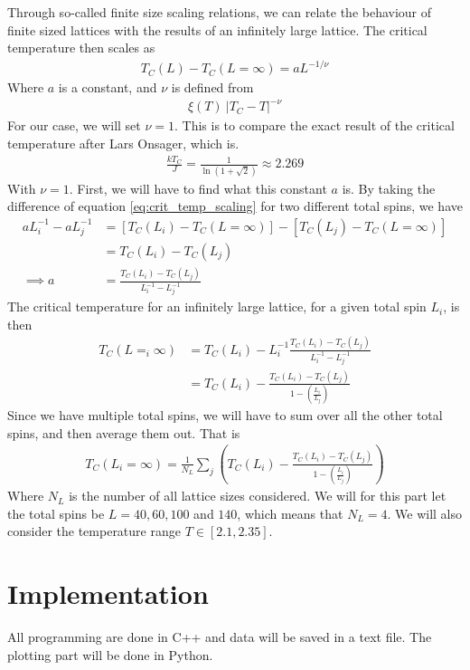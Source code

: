 \documentclass[12pt]{article}
\begin{document}
Through so-called finite size scaling relations, we can relate the behaviour of finite sized lattices with the results of an infinitely large lattice. The critical temperature then scales as
\begin{align}
T_C(L) - T_C(L=\infty) = a L^{-1/\nu}
\label{eq:crit_temp_scaling}
\end{align}
Where $a$ is a constant, and $\nu$ is defined from
\begin{align*}
\xi(T) ~ |T_C - T|^{-\nu}
\end{align*}
For our case, we will set $\nu = 1$. This is to compare the exact result of the critical temperature after Lars Onsager, which is.
\begin{align*}
\frac{kT_C}{J} = \frac{1}{\ln(1 + \sqrt{2})} \approx 2.269
\end{align*}
With $\nu = 1$. First, we will have to find what this constant $a$ is. By taking the difference of equation \ref{eq:crit_temp_scaling} for two different total spins, we have
\begin{align*}
aL_i^{-1} - aL_j^{-1} &= [T_C(L_i) - T_C(L=\infty)] - [T_C(L_j) - T_C(L = \infty)] \\
&= T_C(L_i) - T_C(L_j)\\
\implies a &= \frac{T_C(L_i) - T_C(L_j)}{L_i^{-1} - L_j^{-1}}
\end{align*}
The critical temperature for an infinitely large lattice, for a given total spin $L_i$, is then
\begin{align*}
T_C(L=_i\infty) &= T_C(L_i) - L_i^{-1}\frac{T_C(L_i) - T_C(L_j)}{L_i^{-1} - L_j^{-1}} \\
&= T_C(L_i) - \frac{T_C(L_i) - T_C(L_j)}{1 - \left(\frac{L_i}{L_j} \right)}
\end{align*}
Since we have multiple total spins, we will have to sum over all the other total spins, and then average them out. That is
\begin{align*}
T_C(L_i=\infty) = \frac{1}{N_L} \displaystyle \sum_j \left( T_C(L_i) - \frac{T_C(L_i) - T_C(L_j)}{1 - \left(\frac{L_i}{L_j} \right)} \right)
\end{align*}
Where $N_L$ is the number of all lattice sizes considered. We will for this part let the total spins be $L=40, 60, 100$ and $140$, which means that $N_L = 4$. We will also consider the temperature range $T \in [2.1, 2.35]$.

\section{Implementation} \label{section:implement}
All programming are done in C++ and data will be saved in a text file. The plotting part will be done in Python.
\end{document}
